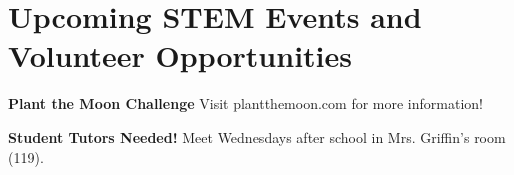 \documentclass[11pt]{article}
\begin{document}
    \section{Upcoming STEM Events and Volunteer Opportunities}
    
    \begin{description}
        \item \textbf{Plant the Moon Challenge} \newline Visit plantthemoon.com for more information!
        \item \textbf{Student Tutors Needed!} \newline 
        Meet Wednesdays after school in Mrs. Griffin's room (119).
    \end{description}
      
\end{document}
